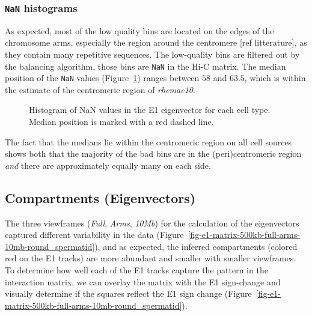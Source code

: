 \documentclass[
  11pt,
  a4paper,
]{scrbook}
\let\oldemph\emph
\renewcommand\emph[1]{\oldemph{\color{gray}#1}}
\begin{document}
\subsubsection{\texorpdfstring{\texttt{NaN}
histograms}{NaN histograms}}\label{nan-histograms}

As expected, most of the low quality bins are located on the edges of
the chromosome arms, especially the region around the centromere {[}ref
litterature{]}, as they contain many repetitive sequences. The
low-quality bins are filtered out by the balancing algorithm, those bins
are \texttt{NaN} in the Hi-C matrix. The median position of the
\texttt{NaN} values (Figure~\ref{fig-e1_nan_hist}) ranges between \(58\)
and \(63.5\), which is within the estimate of the centromeric region of
\emph{rhemac10}.

\begin{figure}[H]


\caption{\label{fig-e1_nan_hist}Histogram of NaN values in the E1
eigenvector for each cell type. Median position is marked with a red
dashed line.}

\end{figure}%

The fact that the medians lie within the centromeric region on all cell
sources shows both that the majority of the bad bins are in the
(peri)centromeric region \emph{and} there are approximately equally many
on each side.

\subsection{Compartments
(Eigenvectors)}\label{compartments-eigenvectors}

The three viewframes (\emph{Full}, \emph{Arms}, \emph{10Mb}) for the
calculation of the eigenvectors captured different variability in the
data (Figure~\ref{fig-e1-matrix-500kb-full-arms-10mb-round_spermatid}),
and as expected, the inferred compartments (colored red on the E1
tracks) are more abundant and smaller with smaller viewframes. To
determine how well each of the E1 tracks capture the pattern in the
interaction matrix, we can overlay the matrix with the E1 sign-change
and visually determine if the squares reflect the E1 sign change
(Figure~\ref{fig-e1-matrix-500kb-full-arms-10mb-round_spermatid}).
\end{document}
